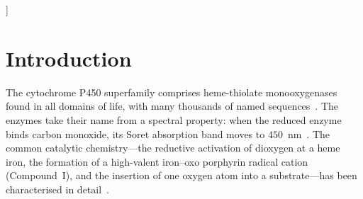 \documentclass[10pt,twocolumn,a4paper]{article}
\begin{document}
\begin{@twocolumnfalse}
\begin{abstract}
heme is buried to $1$--$6\%$ of its isolated accessible surface, and in an
integer-weighted residue contact graph its separation cost from the solvent
exceeds that of every residue. Finally, across twenty heme protein structures
every P450 iron is bound by cysteine sulphur at $2.32$~\AA{} on average,
the cysteine lies at the conserved position of the cysteine-loop signature in
all twelve P450 structures, and the signature matches $82.6\%$ of $1{,}919$
reviewed P450 sequences and $0.07\%$ of $7{,}067$ other heme proteins, the
matches outside the family being enzymes with a P450 domain. We set out
which steps of the chain are derived and which are inputs, and we do not
claim that the chain singles out P450 as the only possible outcome.
\end{abstract}
\vspace{1.2em}
\end{@twocolumnfalse}
]


\section{Introduction}
\label{sec:intro}

The cytochrome P450 superfamily comprises heme-thiolate monooxygenases found
in all domains of life, with many thousands of named
sequences~\citep{nelson2009}. The enzymes take their name from a spectral
property: when the reduced enzyme binds carbon monoxide, its Soret absorption
band moves to $450$~nm~\citep{omura1964}. The common catalytic chemistry---the
reductive activation of dioxygen at a heme iron, the formation of a
high-valent iron--oxo porphyrin radical cation (Compound~I), and the insertion
of one oxygen atom into a substrate---has been characterised in
detail~\citep{denisov2005,poulos2014,rittle2010}.
\end{document}
